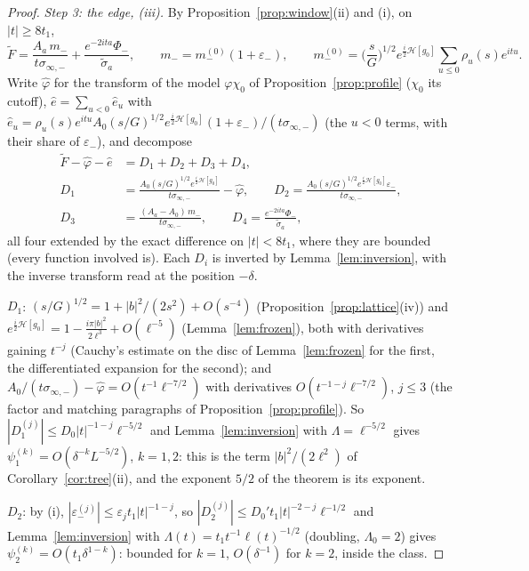 \documentclass[11pt]{article}
\theoremstyle{definition}
\theoremstyle{remark}
\begin{document}
\begin{proof}
\emph{Step 3: the edge, (iii).} By Proposition~\ref{prop:window}(ii) and (i), on $|t|\ge8t_1$,
\[
\tilde F=\frac{A_a\,m_-}{t\sigma_{\infty,-}}+\frac{e^{-2ita}\Phi_-}{\tilde\sigma_a},\qquad m_-=m_-^{(0)}(1+\varepsilon_-),\qquad m_-^{(0)}=\Big(\frac s{G}\Big)^{1/2}e^{\frac i2\mathcal H[g_0]}\sum_{u\le0}\rho_u(s)e^{itu}.
\]
Write $\hat\varphi$ for the transform of the model $\varphi\chi_0$ of Proposition~\ref{prop:profile} ($\chi_0$ its cutoff), $\hat e=\sum_{u<0}\hat e_u$ with $\hat e_u=\rho_u(s)e^{itu}A_0(s/G)^{1/2}e^{\frac i2\mathcal H[g_0]}(1+\varepsilon_-)/(t\sigma_{\infty,-})$ (the $u<0$ terms, with their share of $\varepsilon_-$), and decompose
\begin{align*}
\tilde F-\hat\varphi-\hat e&=D_1+D_2+D_3+D_4,\\
D_1&=\frac{A_0(s/G)^{1/2}e^{\frac i2\mathcal H[g_0]}}{t\sigma_{\infty,-}}-\hat\varphi,\qquad D_2=\frac{A_0(s/G)^{1/2}e^{\frac i2\mathcal H[g_0]}\varepsilon_-}{t\sigma_{\infty,-}},\\
D_3&=\frac{(A_a-A_0)\,m_-}{t\sigma_{\infty,-}},\qquad D_4=\frac{e^{-2ita}\Phi_-}{\tilde\sigma_a},
\end{align*}
all four extended by the exact difference on $|t|<8t_1$, where they are bounded (every function involved is). Each $D_i$ is inverted by Lemma~\ref{lem:inversion}, with the inverse transform read at the position $-\delta$.

$D_1$: $(s/G)^{1/2}=1+|b|^2/(2s^2)+O(s^{-4})$ (Proposition~\ref{prop:lattice}(iv)) and $e^{\frac i2\mathcal H[g_0]}=1-\frac{i\pi|b|^2}{2\ell^3}+O(\ell^{-5})$ (Lemma~\ref{lem:frozen}), both with derivatives gaining $t^{-j}$ (Cauchy's estimate on the disc of Lemma~\ref{lem:frozen} for the first, the differentiated expansion for the second); and $A_0/(t\sigma_{\infty,-})-\hat\varphi=O(t^{-1}\ell^{-7/2})$ with derivatives $O(t^{-1-j}\ell^{-7/2})$, $j\le3$ (the factor and matching paragraphs of Proposition~\ref{prop:profile}). So $|D_1^{(j)}|\le D_0|t|^{-1-j}\ell^{-5/2}$ and Lemma~\ref{lem:inversion} with $\Lambda=\ell^{-5/2}$ gives $\psi_1^{(k)}=O(\delta^{-k}L^{-5/2})$, $k=1,2$: this is the term $|b|^2/(2\ell^2)$ of Corollary~\ref{cor:tree}(ii), and the exponent $5/2$ of the theorem is its exponent.

$D_2$: by (i), $|\varepsilon_-^{(j)}|\le\varepsilon_jt_1|t|^{-1-j}$, so $|D_2^{(j)}|\le D_0't_1|t|^{-2-j}\ell^{-1/2}$ and Lemma~\ref{lem:inversion} with $\Lambda(t)=t_1t^{-1}\ell(t)^{-1/2}$ (doubling, $\Lambda_0=2$) gives $\psi_2^{(k)}=O(t_1\delta^{1-k})$: bounded for $k=1$, $O(\delta^{-1})$ for $k=2$, inside the class.


\end{proof}
\end{document}
